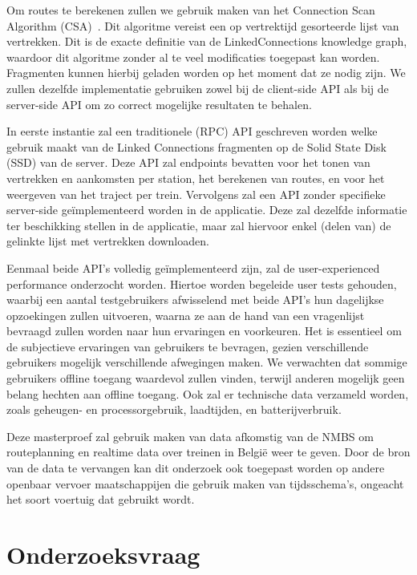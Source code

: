 Om routes te berekenen zullen we gebruik maken van het Connection Scan Algorithm (CSA)~\citep{strasser13,strasser14,strasser17}. Dit algoritme vereist een op vertrektijd gesorteerde lijst van vertrekken. Dit is de exacte definitie van de LinkedConnections knowledge graph, waardoor dit algoritme zonder al te veel modificaties toegepast kan worden. Fragmenten kunnen hierbij geladen worden op het moment dat ze nodig zijn. We zullen dezelfde implementatie gebruiken zowel bij de client-side API als bij de server-side API om zo correct mogelijke resultaten te behalen. 

In eerste instantie zal een traditionele (RPC) API geschreven worden welke gebruik maakt van de Linked Connections fragmenten op de Solid State Disk (SSD) van de server. Deze API zal endpoints bevatten voor het tonen van vertrekken en aankomsten per station, het berekenen van routes, en voor het weergeven van het traject per trein. 
Vervolgens zal een API zonder specifieke server-side geïmplementeerd worden in de applicatie. Deze zal dezelfde informatie ter beschikking stellen in de applicatie, maar zal hiervoor enkel (delen van) de gelinkte lijst met vertrekken downloaden. 

Eenmaal beide API's volledig geïmplementeerd zijn, zal de user-experienced performance onderzocht worden. Hiertoe worden begeleide user tests gehouden, waarbij een aantal testgebruikers afwisselend met beide API's hun dagelijkse opzoekingen zullen uitvoeren, waarna ze aan de hand van een vragenlijst bevraagd zullen worden naar hun ervaringen en voorkeuren. Het is essentieel om de subjectieve ervaringen van gebruikers te bevragen, gezien verschillende gebruikers mogelijk verschillende afwegingen maken. We verwachten dat sommige gebruikers offline toegang waardevol zullen vinden, terwijl anderen mogelijk geen belang hechten aan offline toegang. Ook zal er technische data verzameld worden, zoals geheugen- en processorgebruik, laadtijden, en batterijverbruik. 

Deze masterproef zal gebruik maken van data afkomstig van de NMBS om routeplanning en realtime data over treinen in België weer te geven. Door de bron van de data te vervangen kan dit onderzoek ook toegepast worden op andere openbaar vervoer maatschappijen die gebruik maken van tijdsschema's, ongeacht het soort voertuig dat gebruikt wordt.

\section{Onderzoeksvraag}
 
